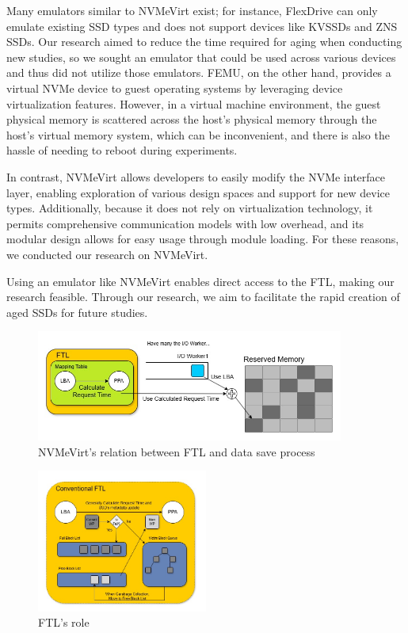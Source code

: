 Many emulators similar to NVMeVirt exist; for instance, FlexDrive can only emulate existing SSD types and does not support devices like KVSSDs and ZNS SSDs. 
Our research aimed to reduce the time required for aging when conducting new studies, so we sought an emulator that could be used across various devices and thus did not utilize those emulators.
FEMU, on the other hand, provides a virtual NVMe device to guest operating systems by leveraging device virtualization features.
However, in a virtual machine environment, the guest physical memory is scattered across the host's physical memory through the host's virtual memory system, which can be inconvenient, and there is also the hassle of needing to reboot during experiments.

In contrast, NVMeVirt allows developers to easily modify the NVMe interface layer, enabling exploration of various design spaces and support for new device types.
Additionally, because it does not rely on virtualization technology, it permits comprehensive communication models with low overhead, and its modular design allows for easy usage through module loading.
For these reasons, we conducted our research on NVMeVirt.

Using an emulator like NVMeVirt enables direct access to the FTL, making our research feasible.
Through our research, we aim to facilitate the rapid creation of aged SSDs for future studies.

\begin{figure}[!t]
    \centering
    \includegraphics[width=0.9\textwidth,keepaspectratio]{figs/FTL's mapping table.jpg}
    \caption{NVMeVirt’s relation between FTL and data save process}
    \label{fig:mappingtable}
\end{figure}
\begin{figure}[!t]
    \centering
    \includegraphics[width=0.5\textwidth,keepaspectratio]{figs/FTL role.jpg}
    \caption{FTL’s role}
    \label{fig:role}
\end{figure}

